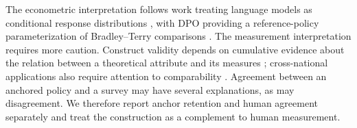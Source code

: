 The econometric interpretation follows work treating language models as conditional response distributions \cite{ludwig2026}, with DPO providing a reference-policy parameterization of Bradley--Terry comparisons \cite{rafailov2023}. The measurement interpretation requires more caution. Construct validity depends on cumulative evidence about the relation between a theoretical attribute and its measures \cite{campbellfiske1959}; cross-national applications also require attention to comparability \cite{steenkamp1998,davidov2014}. Agreement between an anchored policy and a survey may have several explanations, as may disagreement. We therefore report anchor retention and human agreement separately and treat the construction as a complement to human measurement.
